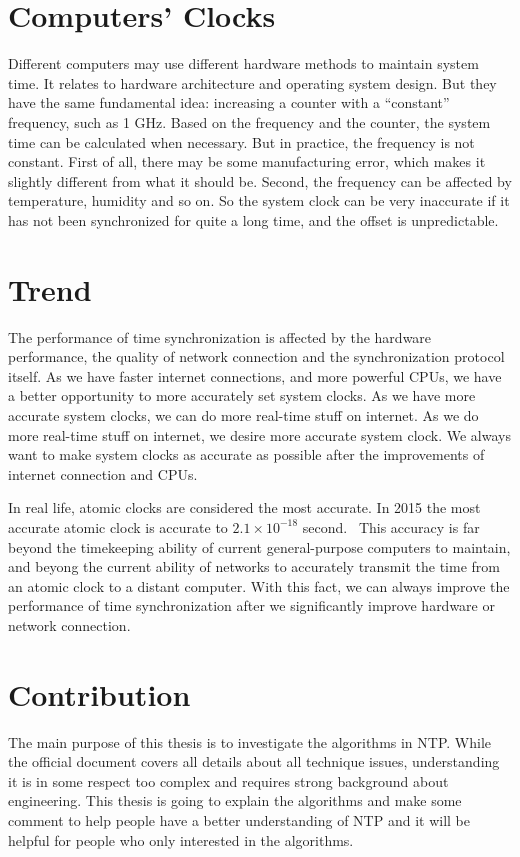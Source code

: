 \section{Computers' Clocks}
\label{sec:computers_clocks}
Different computers may use different hardware methods to maintain system time.
It relates to hardware architecture and operating system design. But they have
the same fundamental idea: increasing a counter with a ``constant'' frequency,
such as 1 GHz.
Based on the frequency and the counter, the system time can be calculated
when necessary. But in practice, the frequency is not constant. First of all,
there may be some manufacturing error, which makes it slightly different from
what it should be. Second, the frequency can be affected by temperature,
humidity and so on. So the system clock can be very inaccurate if it has not
been synchronized for quite a long time, and the offset is unpredictable.

\section{Trend}
\label{sec:trend}
The performance of time synchronization is affected by the hardware
performance, the quality of network connection and the synchronization protocol
itself. 
As we have faster internet connections, and more powerful CPUs, we have a
better opportunity to more accurately set system clocks. As we have more
accurate system clocks, we can do more real-time stuff on internet. As we do
more real-time stuff on internet, we desire more accurate system clock. We
always want to make system clocks as accurate as possible after the
improvements of internet connection and CPUs. 

In real life, atomic clocks are considered the most accurate. In 2015 the most
accurate atomic clock is accurate to $2.1\times 10^{-18}$
second.~\cite{atomic_clock} 
This accuracy is far beyond the timekeeping ability of current general-purpose
computers to maintain, and beyong the current ability of networks to accurately
transmit the time from an atomic clock to a distant computer. With this fact,
we can always improve the performance of time synchronization after we
significantly improve hardware or network connection.

\section{Contribution}
\label{sec:contribution}
The main purpose of this thesis is to investigate the algorithms in NTP\null.
While the official document covers all details about all technique issues,
understanding it is in some respect too complex and requires strong background
about engineering.  This thesis is going to explain the algorithms and make
some comment to help people have a better understanding of NTP and it will be
helpful for people who only interested in the algorithms.
